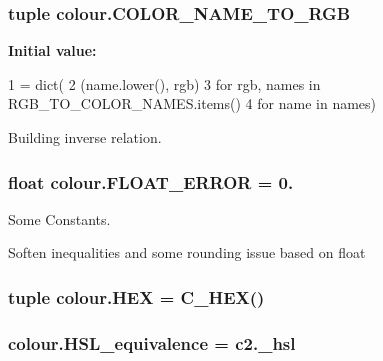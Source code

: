 \subsubsection[{C\+O\+L\+O\+R\+\_\+\+N\+A\+M\+E\+\_\+\+T\+O\+\_\+\+R\+G\+B}]{\setlength{\rightskip}{0pt plus 5cm}tuple colour.\+C\+O\+L\+O\+R\+\_\+\+N\+A\+M\+E\+\_\+\+T\+O\+\_\+\+R\+G\+B}\label{namespacecolour_a57060f3bcb9159b355ef227f92f930c5}
{\bfseries Initial value\+:}
\begin{DoxyCode}
1 = dict(
2     (name.lower(), rgb)
3     \textcolor{keywordflow}{for} rgb, names \textcolor{keywordflow}{in} RGB\_TO\_COLOR\_NAMES.items()
4     \textcolor{keywordflow}{for} name \textcolor{keywordflow}{in} names)
\end{DoxyCode}


Building inverse relation. 

\hypertarget{namespacecolour_af2a4d2191193cc67e779a8f8f7f4eee3}{}
\subsubsection[{F\+L\+O\+A\+T\+\_\+\+E\+R\+R\+O\+R}]{\setlength{\rightskip}{0pt plus 5cm}float colour.\+F\+L\+O\+A\+T\+\_\+\+E\+R\+R\+O\+R = 0.}\label{namespacecolour_af2a4d2191193cc67e779a8f8f7f4eee3}


Some Constants. 

Soften inequalities and some rounding issue based on float \hypertarget{namespacecolour_ad515125b83fe560379560056f4d88801}{}
\subsubsection[{H\+E\+X}]{\setlength{\rightskip}{0pt plus 5cm}tuple colour.\+H\+E\+X = {\bf C\+\_\+\+H\+E\+X}()}\label{namespacecolour_ad515125b83fe560379560056f4d88801}
\hypertarget{namespacecolour_a05409af0388e5b27e95fee4137e636d5}{}
\subsubsection[{H\+S\+L\+\_\+equivalence}]{\setlength{\rightskip}{0pt plus 5cm}colour.\+H\+S\+L\+\_\+equivalence = c2.\+\_\+hsl}\label{namespacecolour_a05409af0388e5b27e95fee4137e636d5}
\hypertarget{namespacecolour_ae4a86e3c28f0ebb79e51c566a1158fe3}{}
